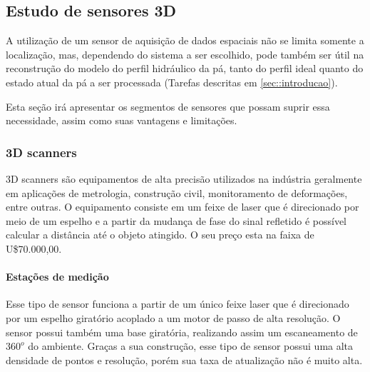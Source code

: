 \subsection{Estudo de sensores 3D}

A utilização de um sensor de aquisição de dados espaciais não se limita somente
a localização, mas, dependendo do sistema a ser escolhido, pode também ser útil
na reconstrução do modelo do perfil hidráulico da pá, tanto do perfil ideal
quanto do estado atual da pá a ser processada (Tarefas descritas em
\ref{sec::introducao}).

Esta seção irá apresentar os segmentos de sensores que possam suprir essa
necessidade, assim como suas vantagens e limitações. 


\subsubsection{3D scanners}

3D scanners são equipamentos de alta precisão utilizados na indústria
geralmente em aplicações de metrologia, construção civil, monitoramento de
deformações, entre outras. O equipamento consiste em um feixe de laser que é
direcionado por meio de um espelho e a partir da mudança de fase do sinal
refletido é possível calcular a distância até o objeto atingido. O seu preço
esta na faixa de U\$70.000,00.

\paragraph{Estações de medição}

Esse tipo de sensor funciona a partir de um único feixe laser que é direcionado
por um espelho giratório acoplado a um motor de passo de alta resolução. O
sensor possui também uma base giratória, realizando assim um escaneamento de
$360^o$ do ambiente. Graças a sua construção, esse tipo de sensor possui uma
alta densidade de pontos e resolução, porém sua taxa de atualização não é muito
alta.

